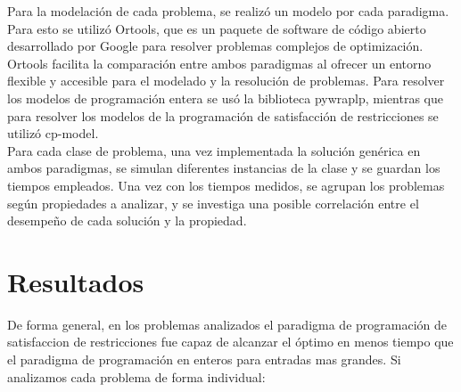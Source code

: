 \documentclass[12pt]{report}
\begin{document}
Para la modelación de cada problema, se realizó un modelo por cada paradigma. Para esto se utilizó Ortools, que es un paquete de software de código abierto desarrollado por Google para resolver problemas complejos de optimización. Ortools facilita la comparación entre ambos paradigmas al ofrecer un entorno flexible y accesible para el modelado y la resolución de problemas. Para resolver los modelos de programación entera se usó la biblioteca pywraplp, mientras que para resolver los modelos de la programación de satisfacción de  restricciones se utilizó cp-model.\\

Para cada clase de problema, una vez implementada la solución genérica en ambos paradigmas, se simulan diferentes instancias de la clase y se guardan los tiempos empleados. Una vez con los tiempos medidos, se agrupan los problemas según propiedades a analizar, y se investiga una posible correlación entre el desempeño de cada solución y la propiedad.

\chapter{Resultados}

De forma general, en los problemas analizados el paradigma de programación de satisfaccion de restricciones fue capaz de alcanzar el óptimo en menos tiempo que el paradigma de programación en enteros para entradas mas grandes. Si analizamos cada problema de forma individual:
\end{document}

